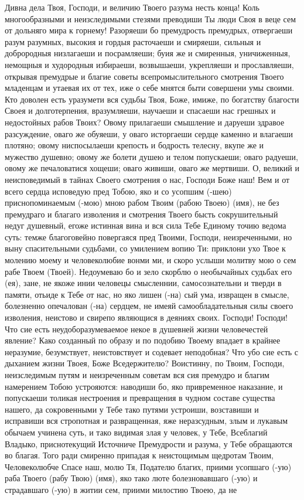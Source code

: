  


Дивна дела Твоя, Господи, и величию Твоего разума несть конца! Коль многообразными и неизследимыми стезями преводиши Ты люди Своя в веце сем от дольняго мира к горнему! Разоряеши бо премудрость премудрых, отвергаеши разум разумных, высокия и гордыя расточаеши и смиряеши, сильныя и доброродныя низлагаеши и посрамляеши; буия же и смиренныя, уничиженныя, немощныя и худородныя избираеши, возвышаеши, укрепляеши и прославляеши, открывая премудрые и благие советы всепромыслительного смотрения Твоего младенцам и утаевая их от тех, иже о себе мнятся быти совершени умы своими. Кто доволен есть уразумети вся судьбы Твоя, Боже, имиже, по богатству благости Своея и долготерпения, вразумляеши, научаеши и спасаеши нас грешных и недостойных рабов Твоих? Овому прилагаеши смышление и даруеши здравое разсуждение, оваго же обуяеши, у оваго исторгаеши сердце каменно и влагаеши плотяно; овому ниспосылаеши крепость и бодрость телесну, вкупе же и мужество душевно; овому же болети душею и телом попускаеши; оваго радуеши, овому же печаловатися хощеши; оваго живиши, оваго же мертвиши. О, великий и неисповедимый в тайнах Своего смотрения о нас, Господи Боже наш! Вем и от всего сердца исповедую пред Тобою, яко и со усопшим (-шею) приснопоминаемым (-мою) мною рабом Твоим (рабою Твоею) (имя), не без премудраго и благаго изволения и смотрения Твоего бысть сокрушительный недуг душевный, егоже истинная вина и вся сила Тебе Единому точию ведома суть: темже благоговейно повергаяся пред Твоими, Господи, неизреченными, но выну спасительными судьбами, со умилением вопию Ти: приклони ухо Твое к молению моему и человеколюбие вонми ми, и скоро услыши молитву мою о сем рабе Твоем (Твоей). Недоумеваю бо и зело скорблю о необычайных судьбах его (ея), зане, не якоже инии человецы смысленнии, самосознательни и тверди в памяти, отьиде к Тебе от нас, но яко лишен (-на) сый ума, извращен в смысле, болезненно опечалован (-на) сердцем, не имеяй самообладательныя силы своего изволения, неистово и свирепо являющися в деяниях своих. Господи! Господи! Что сие есть неудоборазумеваемое некое в душевней жизни человечестей явление? Како созданный по образу и по подобию Твоему впадает в крайнее неразумие, безумствует, неистовствует и содевает неподобная? Что убо сие есть с дыханием жизни Твоея, Боже Вседержителю? Воистинну, по Твоим, Господи, неизследимым путям и неизреченным советам вся сия премудро и благим намерением Тобою устрояются: наводиши бо, яко привременное наказание, и попускаеши толикая нестроения и превращения в чудном составе существа нашего, да сокровенными у Тебе тако путями устроиши, возставиши и исправиши вся стропотная и развращенная, яже неразсудным, злым и лукавым обычаем учинена суть, и тако видимая злая у человек, у Тебе, Всеблагий Владыко, приснотекущий Источниче Премудрости и разума, у Тебе обращаются во благая. Того ради смиренно припадая к неистощимым щедротам Твоим, Человеколюбче Спасе наш, молю Тя, Подателю благих, приими усопшаго (-ую) раба Твоего (рабу Твою) (имя), яко тако люте болезновавшаго (-ую) и страдавшаго (-ую) в житии сем, приими милостию Твоею, да не 